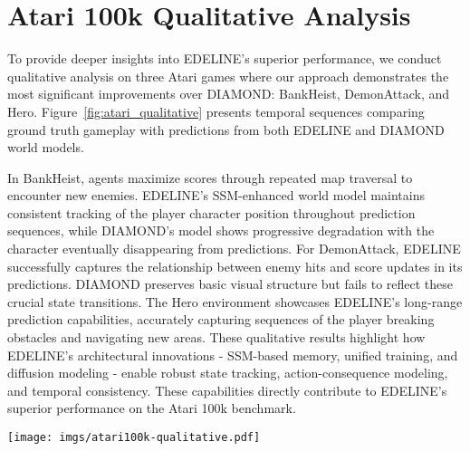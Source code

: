 \section{Atari 100k Qualitative Analysis}
\label{appendix:atari_100k_qualitative}
To provide deeper insights into EDELINE's superior performance, we conduct qualitative analysis on three Atari games where our approach demonstrates the most significant improvements over DIAMOND: BankHeist, DemonAttack, and Hero. 
Figure~\ref{fig:atari_qualitative} presents temporal sequences comparing ground truth gameplay with predictions from both EDELINE and DIAMOND world models.

In BankHeist, agents maximize scores through repeated map traversal to encounter new enemies. EDELINE's SSM-enhanced world model maintains consistent tracking of the player character position throughout prediction sequences, while DIAMOND's model shows progressive degradation with the character eventually disappearing from predictions.
For DemonAttack, EDELINE successfully captures the relationship between enemy hits and score updates in its predictions. DIAMOND preserves basic visual structure but fails to reflect these crucial state transitions.
The Hero environment showcases EDELINE's long-range prediction capabilities, accurately capturing sequences of the player breaking obstacles and navigating new areas. 
These qualitative results highlight how EDELINE's architectural innovations - SSM-based memory, unified training, and diffusion modeling - enable robust state tracking, action-consequence modeling, and temporal consistency. These capabilities directly contribute to EDELINE's superior performance on the Atari 100k benchmark.
\vspace{-1em}
\begin{figure*}[h!]
\centering
\texttt{[image: imgs/atari100k-qualitative.pdf]}
\caption{Qualitative comparison of world model predictions on three Atari games. Each panel shows temporal sequences comparing ground truth with EDELINE and DIAMOND predictions. In BankHeist (top), EDELINE successfully tracks the player character while DIAMOND loses this information. DemonAttack (middle) demonstrates EDELINE's accurate modeling of score updates upon successful hits. Hero (bottom) showcases EDELINE's ability to maintain consistent predictions of complex character-environment interactions across extended sequences. Colored boxes highlight successful (\textcolor{green}{green}) and failed (\textcolor{red}{red}) predictions of key game elements.}
\label{fig:atari_qualitative}
\end{figure*}